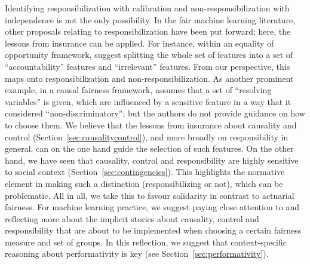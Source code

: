 \documentclass[11pt]{article} %
\makeatletter
\newcommand*{\eg}{e.g.\@\xspace}
\makeatother
\begin{document}
Identifying responsibilization with calibration and non-responsibilization with independence is not the only possibility. In the fair machine learning literature, other proposals relating to responsibilization have been put forward; here, the lessons from insurance can be applied. For instance, within an equality of opportunity framework, \cite{heidari2019moral} suggest splitting the whole set of features into a set of ``accountability'' features and ``irrelevant'' features. From our perspective, this maps onto responsibilization and non-responsibilization. As another prominent example, in a causal fairness framework, \citet{kilbertus2017avoiding} assumes that a set of ``resolving variables'' is given, which are influenced by a sensitive feature in a way that it considered ``non-discriminatory''; but the authors do not provide guidance on how to choose them. 
We believe that the lessons from insurance about causality and control (Section~\ref{sec:causalitycontrol}), and more broadly on responsibility in general, can on the one hand guide the selection of such features. On the other hand, we have seen that causality, control and responsibility are highly sensitive to social context (Section~\ref{sec:contingencies}). This highlights the normative element in making such a distinction (responsibilizing or not), which can be problematic. All in all, we take this to favour solidarity in contrast to actuarial fairness.
For machine learning practice, we suggest paying close attention to and reflecting more about the implicit stories about causality, control and responsibility that are about to be implemented when choosing a certain fairness measure and set of groups. In this reflection, we suggest that context-specific reasoning about performativity is key (see Section~\ref{sec:performativity}).
\end{document}
